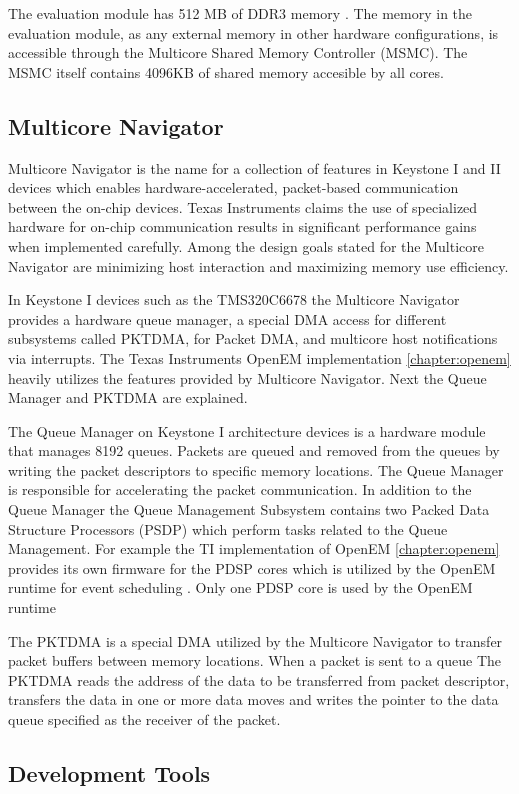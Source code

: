 The evaluation module has 512 MB of DDR3 memory \cite{evmref}. The memory in
the evaluation module, as any external memory in other hardware configurations,
is accessible through the Multicore Shared Memory Controller (MSMC). The MSMC
itself contains 4096KB of shared memory accesible by all cores.

\subsection{Multicore Navigator} \label{subsec:multicorenav} Multicore
Navigator is the name for a collection of features in Keystone I and II devices
which enables hardware-accelerated, packet-based communication between the
on-chip devices. Texas Instruments claims the use of specialized hardware for
on-chip communication results in significant performance gains when implemented
carefully. Among the design goals stated for the Multicore Navigator are
minimizing host interaction and maximizing memory use efficiency.
\cite{navigator}

In Keystone I devices such as the TMS320C6678 the Multicore Navigator provides
a hardware queue manager, a special DMA access for different subsystems called
PKTDMA, for Packet DMA, and multicore host notifications via interrupts.
\cite{navigator} The Texas Instruments OpenEM implementation
\ref{chapter:openem} heavily utilizes the features provided by Multicore
Navigator. Next the Queue Manager and PKTDMA are explained.

The Queue Manager on Keystone I architecture devices is a hardware module that
manages 8192 queues. Packets are queued and removed from the queues by writing
the packet descriptors to specific memory locations. The Queue Manager is
responsible for accelerating the packet communication. In addition to the Queue
Manager the Queue Management Subsystem contains two Packed Data Structure
Processors (PSDP) which perform tasks related to the Queue Management.
\cite{navigator} For example the TI implementation of OpenEM
\ref{chapter:openem} provides its own firmware for the PDSP cores which is
utilized by the OpenEM runtime for event scheduling \cite{openemwhite}. Only
one PDSP core is used by the OpenEM runtime

The PKTDMA is a special DMA utilized by the Multicore Navigator to transfer
packet buffers between memory locations. When a packet is sent to a queue The
PKTDMA reads the address of the data to be transferred from packet descriptor,
transfers the data in one or more data moves and writes the pointer to the data
queue specified as the receiver of the packet. \cite{navigator}
\subsection{Development Tools} \label{subsec:devtools}

